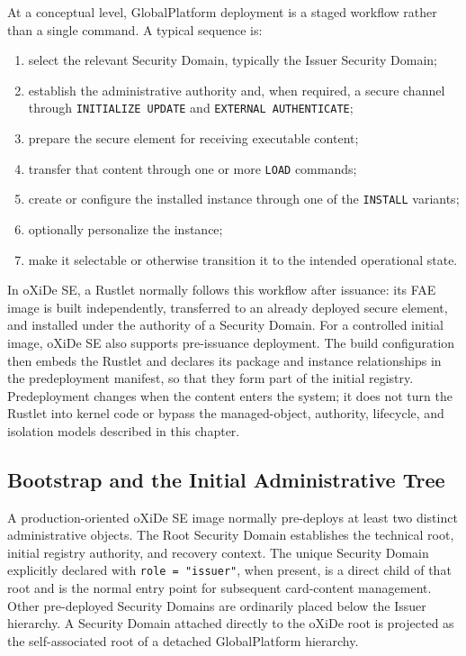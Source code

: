 At a conceptual level, GlobalPlatform deployment is a staged workflow
rather than a single command. A typical sequence is:

\begin{enumerate}
\item select the relevant Security Domain, typically the Issuer Security
  Domain;
\item establish the administrative authority and, when required, a
  secure channel through \texttt{INITIALIZE UPDATE} and
  \texttt{EXTERNAL AUTHENTICATE};
\item prepare the secure element for receiving executable content;
\item transfer that content through one or more \texttt{LOAD} commands;
\item create or configure the installed instance through one of the
  \texttt{INSTALL} variants;
\item optionally personalize the instance;
\item make it selectable or otherwise transition it to the intended
  operational state.
\end{enumerate}

In oXiDe SE, a Rustlet normally follows this workflow after issuance: its FAE
image is built independently, transferred to an already deployed secure
element, and installed under the authority of a Security Domain. For a
controlled initial image, oXiDe SE also supports pre-issuance deployment. The
build configuration then embeds the Rustlet and declares its package and
instance relationships in the predeployment manifest, so that they form part of
the initial registry. Predeployment changes when the content enters the system;
it does not turn the Rustlet into kernel code or bypass the managed-object,
authority, lifecycle, and isolation models described in this chapter.

\subsection{Bootstrap and the Initial Administrative Tree}

A production-oriented oXiDe SE image normally pre-deploys at least two distinct
administrative objects. The Root Security Domain establishes the technical
root, initial registry authority, and recovery context. The unique Security
Domain explicitly declared with \texttt{role = "issuer"}, when present, is a
direct child of that root and is the normal entry point for subsequent
card-content management. Other pre-deployed Security Domains are ordinarily
placed below the Issuer hierarchy. A Security Domain attached directly to the
oXiDe root is projected as the self-associated root of a detached
GlobalPlatform hierarchy.

